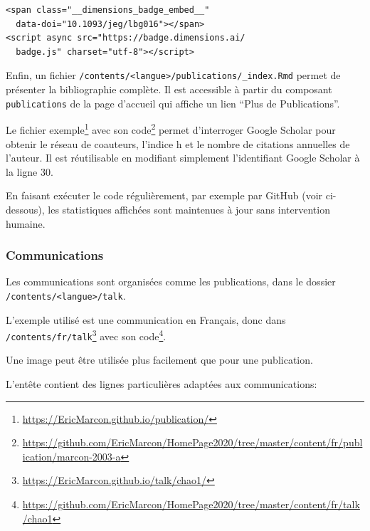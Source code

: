 \documentclass[
  12pt,
  french,
  a4paper,
  extrafontsizes,onecolumn,openright
  ]{memoir}
\begin{document}
\begin{verbatim}
<span class="__dimensions_badge_embed__" 
  data-doi="10.1093/jeg/lbg016"></span>
<script async src="https://badge.dimensions.ai/
  badge.js" charset="utf-8"></script>
\end{verbatim}

Enfin, un fichier \texttt{/contents/\textless{}langue\textgreater{}/publications/\_index.Rmd} permet de présenter la bibliographie complète.
Il est accessible à partir du composant \texttt{publications} de la page d'accueil qui affiche un lien \enquote{Plus de Publications}.

Le fichier exemple\footnote{\url{https://EricMarcon.github.io/publication/}} avec son code\footnote{\url{https://github.com/EricMarcon/HomePage2020/tree/master/content/fr/publication/marcon-2003-a}} permet d'interroger Google Scholar pour obtenir le réseau de coauteurs, l'indice h et le nombre de citations annuelles de l'auteur.
Il est réutilisable en modifiant simplement l'identifiant Google Scholar à la ligne 30.

En faisant exécuter le code régulièrement, par exemple par GitHub (voir ci-dessous), les statistiques affichées sont maintenues à jour sans intervention humaine.

\hypertarget{communications}{%
\subsubsection{Communications}\label{communications}}

Les communications sont organisées comme les publications, dans le dossier \texttt{/contents/\textless{}langue\textgreater{}/talk}.

L'exemple utilisé est une communication en Français, donc dans \texttt{/contents/fr/talk}\footnote{\url{https://EricMarcon.github.io/talk/chao1/}} avec son code\footnote{\url{https://github.com/EricMarcon/HomePage2020/tree/master/content/fr/talk/chao1}}.

Une image peut être utilisée plus facilement que pour une publication.

L'entête contient des lignes particulières adaptées aux communications:
\end{document}
